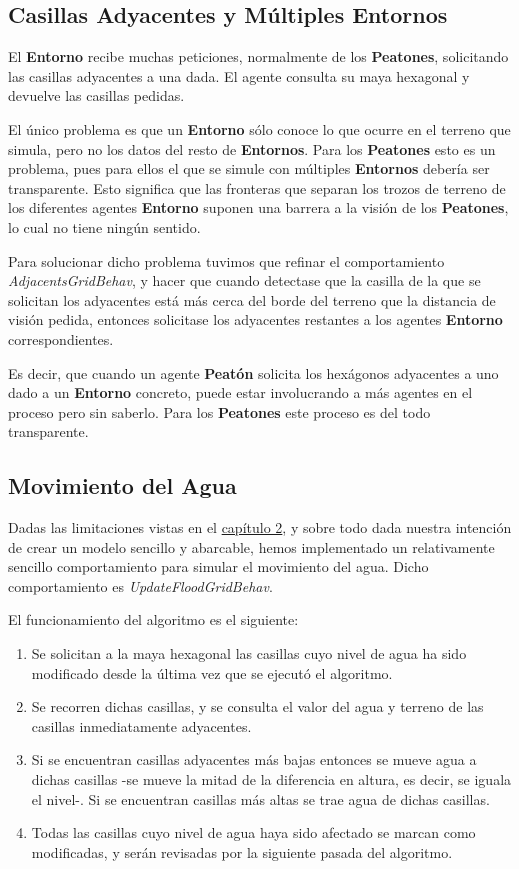 \subsection{Casillas Adyacentes y Múltiples Entornos}

El {\bf Entorno} recibe muchas peticiones, normalmente de los {\bf Peatones},
solicitando las casillas adyacentes a una dada. El agente consulta su maya
hexagonal y devuelve las casillas pedidas.

El único problema es que un {\bf Entorno} sólo conoce lo que ocurre en el
terreno que simula, pero no los datos del resto de {\bf Entornos}. Para los
{\bf Peatones} esto es un problema, pues para ellos el que se simule con
múltiples {\bf Entornos} debería ser transparente. Esto significa que las
fronteras que separan los trozos de terreno de los diferentes agentes {\bf
Entorno} suponen una barrera a la visión de los {\bf Peatones}, lo cual no
tiene ningún sentido.

Para solucionar dicho problema tuvimos que refinar el comportamiento {\em
AdjacentsGridBehav}, y hacer que cuando detectase que la casilla de la que se
solicitan los adyacentes está más cerca del borde del terreno que la distancia
de visión pedida, entonces solicitase los adyacentes restantes a los agentes
{\bf Entorno} correspondientes.

Es decir, que cuando un agente {\bf Peatón} solicita los hexágonos adyacentes a
uno dado a un {\bf Entorno} concreto, puede estar involucrando a más agentes en
el proceso pero sin saberlo. Para los {\bf Peatones} este proceso es del todo
transparente.

\subsection{Movimiento del Agua}\label{waterMovement}

Dadas las limitaciones vistas en el \hyperref[cap2]{capítulo 2}, y sobre todo
dada nuestra intención de crear un modelo sencillo y abarcable, hemos
implementado un relativamente sencillo comportamiento para simular el
movimiento del agua. Dicho comportamiento es {\em UpdateFloodGridBehav}.

El funcionamiento del algoritmo es el siguiente:

\begin{enumerate}
 \item Se solicitan a la maya hexagonal las casillas cuyo nivel de agua ha sido
 modificado desde la última vez que se ejecutó el algoritmo.
 \item Se recorren dichas casillas, y se consulta el valor del agua y terreno
 de las casillas inmediatamente adyacentes.
 \item Si se encuentran casillas adyacentes más bajas entonces se mueve agua a
 dichas casillas -se mueve la mitad de la diferencia en altura, es decir, se
 iguala el nivel-. Si se encuentran casillas más altas se trae agua de dichas
 casillas.
 \item Todas las casillas cuyo nivel de agua haya sido afectado se marcan como
 modificadas, y serán revisadas por la siguiente pasada del algoritmo.
\end{enumerate}

